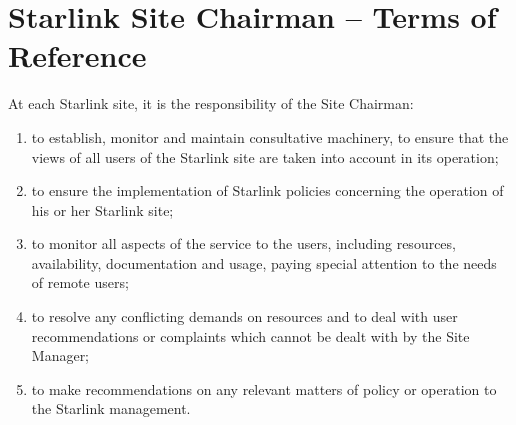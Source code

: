 \documentclass[twoside,11pt]{article}
\begin{document}
\appendix
\section{Starlink Site Chairman -- Terms of Reference}

At each Starlink site, it is the responsibility of the Site Chairman:
\begin{enumerate}
\item to establish, monitor and maintain consultative machinery,
      to ensure that the views of all users of the Starlink site
      are taken into account in its operation;
\item to ensure the implementation of Starlink policies concerning the
      operation of his or her Starlink site;
\item to monitor all aspects of the service to the users, including
      resources, availability, documentation and usage, paying special
      attention to the needs of remote users;
\item to resolve any conflicting demands on resources and to deal with
      user recommendations or complaints which cannot be dealt with by the
      Site Manager;
\item to make recommendations on any relevant matters of policy or
      operation to the Starlink management.
\end{enumerate}
\end{document}
